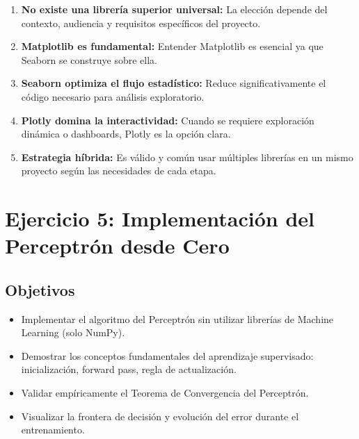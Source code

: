 \documentclass[12pt]{src/formato_utem}
\begin{document}
\begin{enumerate}
    \item \textbf{No existe una librería superior universal:} La elección depende del contexto, audiencia y requisitos específicos del proyecto.
    
    \item \textbf{Matplotlib es fundamental:} Entender Matplotlib es esencial ya que Seaborn se construye sobre ella.
    
    \item \textbf{Seaborn optimiza el flujo estadístico:} Reduce significativamente el código necesario para análisis exploratorio.
    
    \item \textbf{Plotly domina la interactividad:} Cuando se requiere exploración dinámica o dashboards, Plotly es la opción clara.
    
    \item \textbf{Estrategia híbrida:} Es válido y común usar múltiples librerías en un mismo proyecto según las necesidades de cada etapa.
\end{enumerate}

\newpage

\section{Ejercicio 5: Implementación del Perceptrón desde Cero}

\subsection{Objetivos}

\begin{itemize}
    \item Implementar el algoritmo del Perceptrón sin utilizar librerías de Machine Learning (solo NumPy).
    \item Demostrar los conceptos fundamentales del aprendizaje supervisado: inicialización, forward pass, regla de actualización.
    \item Validar empíricamente el Teorema de Convergencia del Perceptrón.
    \item Visualizar la frontera de decisión y evolución del error durante el entrenamiento.
\end{itemize}
\end{document}
